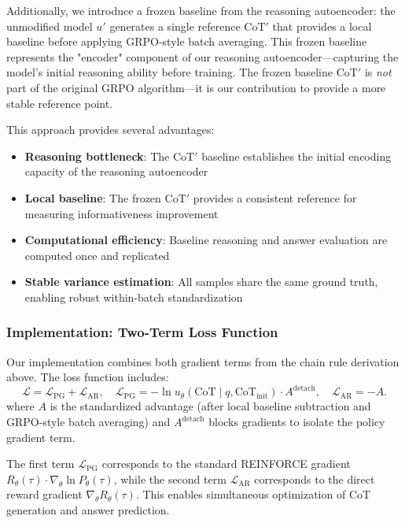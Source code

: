 \documentclass{article} %
\begin{document}
Additionally, we introduce a frozen baseline from the reasoning autoencoder: the unmodified model $u'$ generates a single reference $\text{CoT}'$ that provides a local baseline before applying GRPO-style batch averaging. This frozen baseline represents the "encoder" component of our reasoning autoencoder—capturing the model's initial reasoning ability before training. The frozen baseline $\text{CoT}'$ is \emph{not} part of the original GRPO algorithm—it is our contribution to provide a more stable reference point.

This approach provides several advantages:
\begin{itemize}
    \item \textbf{Reasoning bottleneck}: The $\text{CoT}'$ baseline establishes the initial encoding capacity of the reasoning autoencoder
    \item \textbf{Local baseline}: The frozen $\text{CoT}'$ provides a consistent reference for measuring informativeness improvement
    \item \textbf{Computational efficiency}: Baseline reasoning and answer evaluation are computed once and replicated
    \item \textbf{Stable variance estimation}: All samples share the same ground truth, enabling robust within-batch standardization
\end{itemize}

\subsubsection{Implementation: Two-Term Loss Function}
\label{subsubsec:actor_rewards}
Our implementation combines both gradient terms from the chain rule derivation above. The loss function includes:
\[\mathcal{L}=\mathcal{L}_{\text{PG}}+\mathcal{L}_{\text{AR}},\quad
\mathcal{L}_{\text{PG}}=-\ln u_\theta(\text{CoT} \mid q, \text{CoT}_{\text{init}})\cdot A^{\text{detach}},\quad
\mathcal{L}_{\text{AR}}=-A.\]
where $A$ is the standardized advantage (after local baseline subtraction and GRPO-style batch averaging) and $A^{\text{detach}}$ blocks gradients to isolate the policy gradient term. 

The first term $\mathcal{L}_{\text{PG}}$ corresponds to the standard REINFORCE gradient $R_\theta(\tau) \cdot \nabla_\theta \ln P_\theta(\tau)$, while the second term $\mathcal{L}_{\text{AR}}$ corresponds to the direct reward gradient $\nabla_\theta R_\theta(\tau)$. This enables simultaneous optimization of CoT generation and answer prediction.
\end{document}
